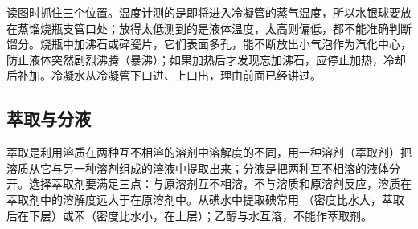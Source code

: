 \documentclass[UTF8,a4paper,zihao=5,oneside,openany,fontset=none]{ctexbook}
\begin{document}
读图时抓住三个位置。温度计测的是即将进入冷凝管的蒸气温度，所以水银球要放在蒸馏烧瓶支管口处；放得太低测到的是液体温度，太高则偏低，都不能准确判断馏分。烧瓶中加沸石或碎瓷片，它们表面多孔，能不断放出小气泡作为汽化中心，防止液体突然剧烈沸腾（暴沸）；如果加热后才发现忘加沸石，应停止加热，冷却后补加。冷凝水从冷凝管下口进、上口出，理由前面已经讲过。

\subsection{萃取与分液}

萃取是利用溶质在两种互不相溶的溶剂中溶解度的不同，用一种溶剂（萃取剂）把溶质从它与另一种溶剂组成的溶液中提取出来；分液是把两种互不相溶的液体分开。选择萃取剂要满足三点：与原溶剂互不相溶，不与溶质和原溶剂反应，溶质在萃取剂中的溶解度远大于在原溶剂中。从碘水中提取碘常用 （密度比水大，萃取后在下层）或苯（密度比水小，在上层）；乙醇与水互溶，不能作萃取剂。
\end{document}
